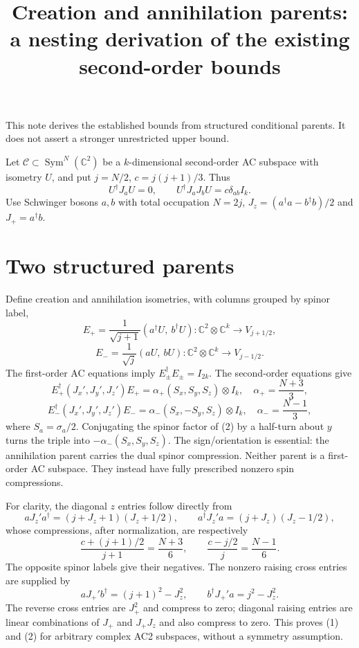 \documentclass[11pt]{article}
\begin{document}
\title{Creation and annihilation parents: a nesting derivation of the existing second-order bounds}
\author{}\date{}\maketitle
This note derives the established bounds from structured conditional
parents. It does not assert a stronger unrestricted upper bound.

Let $\mathcal C\subset\operatorname{Sym}^N(\mathbb C^2)$ be a
$k$-dimensional second-order AC subspace with isometry $U$, and put
$j=N/2$, $c=j(j+1)/3$. Thus
\[
 U^\dagger J_aU=0,\qquad U^\dagger J_aJ_bU=c\delta_{ab}I_k.
\]
Use Schwinger bosons $a,b$ with total occupation $N=2j$,
$J_z=(a^\dagger a-b^\dagger b)/2$ and $J_+=a^\dagger b$.

\section*{Two structured parents}
Define creation and annihilation isometries, with columns grouped by
spinor label,
\[
 E_+=\frac{1}{\sqrt{j+1}}(a^\dagger U,\ b^\dagger U)
 :\mathbb C^2\otimes\mathbb C^k\longrightarrow V_{j+1/2},
\]
\[
 E_-=\frac{1}{\sqrt j}(aU,\ bU)
 :\mathbb C^2\otimes\mathbb C^k\longrightarrow V_{j-1/2}.
\]
The first-order AC equations imply $E_\pm^\dagger E_\pm=I_{2k}$.
The second-order equations give
\[
 E_+^\dagger(J_x',J_y',J_z')E_+
 =\alpha_+(S_x,S_y,S_z)\otimes I_k,
 \quad\alpha_+=\frac{N+3}{3},
\tag{1}
\]
\[
 E_-^\dagger(J_x',J_y',J_z')E_-
 =\alpha_-(S_x,-S_y,S_z)\otimes I_k,
 \quad\alpha_-=\frac{N-1}{3},
\tag{2}
\]
where $S_a=\sigma_a/2$. Conjugating the spinor factor of (2) by a
half-turn about $y$ turns the triple into $-\alpha_-(S_x,S_y,S_z)$.
The sign/orientation is essential: the annihilation parent carries the
dual spinor compression. Neither parent is a first-order AC subspace.
They instead have fully prescribed nonzero spin compressions.

For clarity, the diagonal $z$ entries follow directly from
\[
 aJ_z'a^\dagger=(j+J_z+1)(J_z+1/2),\qquad
 a^\dagger J_z'a=(j+J_z)(J_z-1/2),
\]
whose compressions, after normalization, are respectively
\[
 \frac{c+(j+1)/2}{j+1}=\frac{N+3}{6},\qquad
 \frac{c-j/2}{j}=\frac{N-1}{6}.
\]
The opposite spinor labels give their negatives. The nonzero raising
cross entries are supplied by
\[
 aJ_+'b^\dagger=(j+1)^2-J_z^2,\qquad
 b^\dagger J_+'a=j^2-J_z^2.
\]
The reverse cross entries are $J_+^2$ and compress to zero; diagonal
raising entries are linear combinations of $J_+$ and $J_+J_z$ and
also compress to zero. This proves (1) and (2) for arbitrary complex
AC2 subspaces, without a symmetry assumption.
\end{document}
